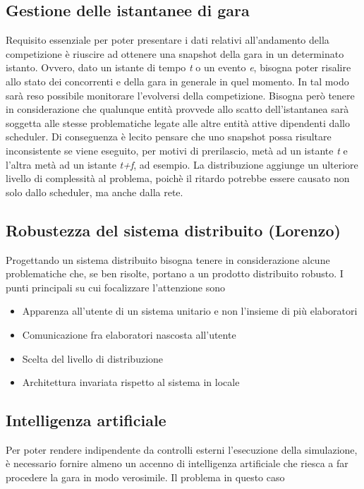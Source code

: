 \subsection{Gestione delle istantanee di gara}
Requisito essenziale per poter presentare i dati relativi all'andamento della competizione è riuscire ad ottenere una
snapshot della gara in un determinato istanto. Ovvero, dato un istante di tempo \emph{t} o un evento \emph{e}, bisogna
poter risalire allo stato dei concorrenti e della gara in generale in quel momento. In tal modo sarà reso possibile
monitorare l'evolversi della competizione. Bisogna però tenere in considerazione che qualunque entità provvede allo scatto
dell'istantanea sarà soggetta alle stesse problematiche legate alle altre entità attive dipendenti dallo scheduler. 
Di conseguenza è lecito pensare che uno snapshot possa risultare inconsistente se viene eseguito, per motivi di 
prerilascio, metà ad un istante
\emph{t} e l'altra metà ad un istante \emph{t+f}, ad esempio. La distribuzione aggiunge un ulteriore livello di complessità
al problema, poichè il ritardo potrebbe essere causato non solo dallo scheduler, ma anche dalla rete.
\subsection{Robustezza del sistema distribuito (Lorenzo)}
Progettando un sistema distribuito bisogna tenere in considerazione alcune problematiche che, se ben risolte, portano a un prodotto distribuito robusto.
I punti principali su cui focalizzare l'attenzione sono
\begin{itemize}
\item Apparenza all'utente di un sistema unitario e non l'insieme di pi\`{u} elaboratori
\item Comunicazione fra elaboratori nascosta all'utente
\item Scelta del livello di distribuzione
\item Architettura invariata rispetto al sistema in locale
\end{itemize}
\subsection{Intelligenza artificiale}
Per poter rendere indipendente da controlli esterni l'esecuzione della simulazione, è necessario fornire almeno un accenno
di intelligenza artificiale che riesca a far procedere la gara in modo verosimile. Il problema in questo caso

